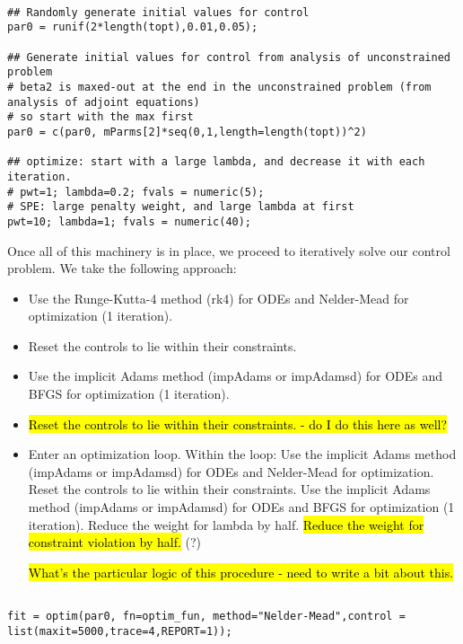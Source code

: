\documentclass[12pt, oneside]{article}   	%
\begin{document}
\begin{lstlisting}

## Randomly generate initial values for control
par0 = runif(2*length(topt),0.01,0.05); 

## Generate initial values for control from analysis of unconstrained problem
# beta2 is maxed-out at the end in the unconstrained problem (from analysis of adjoint equations)   
# so start with the max first
par0 = c(par0, mParms[2]*seq(0,1,length=length(topt))^2) 

## optimize: start with a large lambda, and decrease it with each iteration. 
# pwt=1; lambda=0.2; fvals = numeric(5);  
# SPE: large penalty weight, and large lambda at first 
pwt=10; lambda=1; fvals = numeric(40);  

\end{lstlisting}

Once all of this machinery is in place, we proceed to iteratively solve our control problem. We take the following approach:

\begin{itemize}
\item Use the Runge-Kutta-4 method (rk4) for ODEs and Nelder-Mead for optimization (1 iteration).
\item Reset the controls to lie within their constraints.
\item Use the implicit Adams method (impAdams or impAdamsd) for ODEs and BFGS for optimization (1 iteration).
\item \hl{Reset the controls to lie within their constraints. - do I do this here as well?}
\item Enter an optimization loop. Within the loop:
\subitem Use the implicit Adams method (impAdams or impAdamsd) for ODEs and Nelder-Mead for optimization.
\subitem Reset the controls to lie within their constraints.
\subitem Use the implicit Adams method (impAdams or impAdamsd) for ODEs and BFGS for optimization (1 iteration).
\subitem Reduce the weight for lambda by half.
\subitem \hl{Reduce the weight for constraint violation by half.} (?)

\hl{What's the particular logic of this procedure - need to write a bit about this. }

\end{itemize}

\begin{lstlisting}

fit = optim(par0, fn=optim_fun, method="Nelder-Mead",control = list(maxit=5000,trace=4,REPORT=1));

\end{lstlisting}


\clearpage

\clearpage
 

\end{document}
